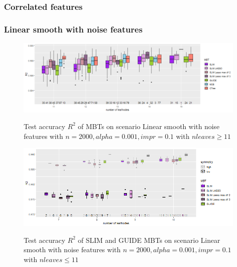 \begin{table}[!htb]
\begin{tabular}[t]{l|l|r|r|r|r|r|r|r|r|r}
\end{tabular}
\label{tab:app_linear_mixed_5000}

\end{table}


\clearpage
\subsubsection{Correlated features}

\subsubsection{Linear smooth with noise features}

\begin{figure}[!htb]
\caption{Test accuracy $R^2$ of MBTs on scenario Linear smooth with noise features with $n=2000, alpha = 0.001, impr = 0.1$ with $n leaves \geq 11$}
    \includegraphics[width=16cm]{Figures/simulations/batchtools/lasso/lasso_standalone_r2_test.png}
    \label{fig:app_lasso_standalone_r2_test}
\end{figure} 

\begin{figure}[!htb]
\caption{Test accuracy $R^2$ of SLIM and GUIDE MBTs on scenario Linear smooth with noise features with $n=2000, alpha = 0.001, impr = 0.1$ with $n leaves \leq 11$}
    \includegraphics[width=16cm]{Figures/simulations/batchtools/lasso/lasso_standalone_r2_test_slim.png}
    \label{fig:app_lasso_standalone_r2_test_slim}
\end{figure} 

